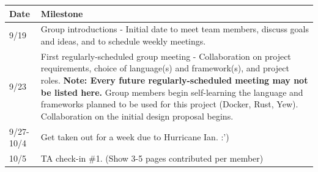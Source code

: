 \documentclass[
    paper=letter,
    parskip=half,
    fontsize=12pt,
    titlepage=firstiscover,
    toc=bibliography,
    numbers=endperiod
]{scrartcl}
\begin{document}
{\renewcommand{\arraystretch}{1.4}
    \begin{tabularx}{\textwidth}{|l|X|}
        \hline
        \textbf{Date} & \textbf{Milestone}                                                                                                                                                                                                                                                                                                                                                                                                                   \\\hline
        9/19          & Group introductions - Initial date to meet team members, discuss goals and ideas, and to schedule weekly meetings.                                                                                                                                                                                                                                                                                                                   \\\hline
        9/23          & First regularly-scheduled group meeting - Collaboration on project requirements, choice of language(s) and framework(s), and project roles. \newline \textbf{Note: Every future regularly-scheduled meeting may not be listed here.} \newline \newline Group members begin self-learning the language and frameworks planned to be used for this project (Docker, Rust, Yew). Collaboration on the initial design proposal begins.   \\\hline
        9/27-10/4     & Get taken out for a week due to Hurricane Ian. :')                                                                                                                                                                                                                                                                                                                                                                                   \\\hline
        10/5          & TA check-in \#1. (Show 3-5 pages contributed per member)                                                                                                                                                                                                                                                                                                                                                                             \\\hline

\end{tabularx}}
\end{document}
